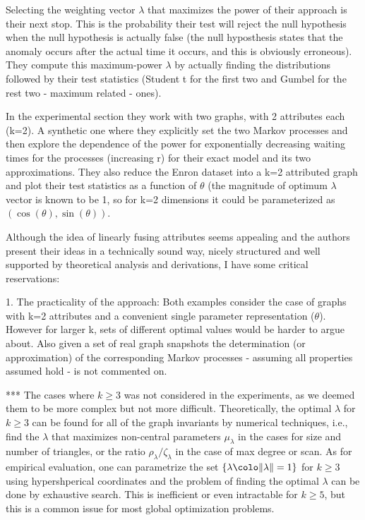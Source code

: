 Selecting the weighting vector $\lambda$ that maximizes the power of
their approach is their next stop. This is the probability their test
will reject the null hypothesis when the null hypothesis is actually
false (the null hyposthesis states that the anomaly occurs after the
actual time it occurs, and this is obviously erroneous). They compute
this maximum-power $\lambda$ by actually finding the distributions
followed by their test statistics (Student t for the first two and
Gumbel for the rest two - maximum related - ones).

In the experimental section they work with two graphs, with 2
attributes each (k=2). A synthetic one where they explicitly set the
two Markov processes and then explore the dependence of the power for
exponentially decreasing waiting times for the processes (increasing
r) for their exact model and its two approximations. They also reduce
the Enron dataset into a k=2 attributed graph and plot their test
statistics as a function of $\theta$ (the magnitude of optimum
$\lambda$ vector is known to be 1, so for k=2 dimensions it could be
parameterized as $(\cos(\theta), \sin(\theta))$.

Although the idea of linearly fusing attributes seems appealing and
the authors present their ideas in a technically sound way, nicely
structured and well supported by theoretical analysis and derivations,
I have some critical reservations:

1. The practicality of the approach: Both examples consider the case
of graphs with k=2 attributes and a convenient single parameter
representation ($\theta$). However for larger k, sets of different
optimal values would be harder to argue about. Also given a set of
real graph snapshots the determination (or approximation) of the
corresponding Markov processes - assuming all properties assumed hold
- is not commented on.

*** 
    The cases where $ k \geq 3$ was not considered in the experiments,
    as we deemed them to be more complex but not more
    difficult. Theoretically, the optimal $\lambda$ for $k \geq 3$ can
    be found for all of the graph invariants by numerical techniques,
    i.e., find the $\lambda$ that maximizes non-central parameters
    $\mu_{\lambda}$ in the cases for size and number of triangles, or
    the ratio $\rho_{\lambda}/\zeta_{\lambda}$ in the case of max
    degree or scan. As for empirical evaluation, one can parametrize 
    the set $\{\lambda \colo \| \lambda \| = 1\}$ for $k \geq 3$
    using hypershperical coordinates and the problem of finding the
    optimal $\lambda$ can be done by exhaustive search. This is 
    inefficient or even intractable for $k \geq 5$, but this is a
    common issue for most global optimization problems. 
    
